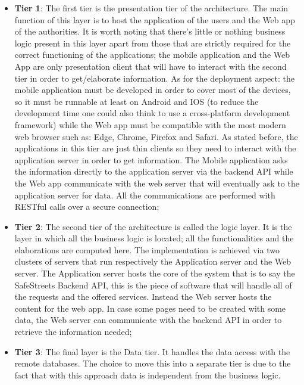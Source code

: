 \begin{itemize}
  \item \textbf{Tier 1}: The first tier is the presentation tier of the architecture. The main function of this layer is to host  the application of the users and the Web app of the authorities. It is worth noting that there's little or nothing business logic present in this layer apart from those that are strictly required for the correct functioning of the applications; the mobile application and the Web App are only presentation client that will have to interact with the second tier in order to get/elaborate information. As for the deployment aspect: the mobile application must be developed in order to cover most of the devices, so it must be runnable at least on Android and IOS (to reduce the development time one could also think to use a cross-platform development framework) while the Web app must be compatible with the most modern web browser such as: Edge, Chrome, Firefox and Safari. As stated before, the applications in this tier are just thin clients so they need to interact with the application server in order to get information. The Mobile application asks the information directly to the application server via the backend API while the Web app communicate with the web server that will eventually ask to the application server for data. All the communications are performed with RESTful calls over a secure connection;
  \item \textbf{Tier 2}: The second tier of the architecture is called the logic layer. It is the layer in which all the business logic is located; all the functionalities and the elaborations are computed here. The implementation is achieved via two clusters of servers that run respectively the Application server and the Web server. The Application server hosts the core of the system that is to say the SafeStreets Backend API, this is the piece of software that will handle all of the requests and the offered services. Instead the Web server hosts the content for the web app. In case some pages need to be created with some data, the Web server can communicate with the backend API in order to retrieve the information needed;
  \item \textbf{Tier 3}: The final layer is the Data tier. It handles the data access with the remote databases. The choice to move this into a separate tier is due to the fact that with this approach data is independent from the business logic.
\end{itemize}
